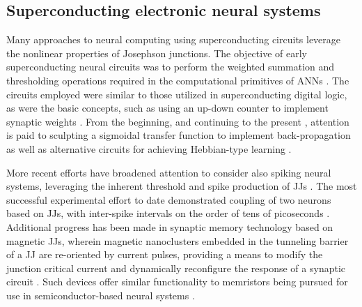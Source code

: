 \documentclass[twocolumn]{article}
\begin{document}
\subsection{Superconducting electronic neural systems}
Many approaches to neural computing using superconducting circuits leverage the nonlinear properties of Josephson junctions. The objective of early superconducting neural circuits was to perform the weighted summation and thresholding operations required in the computational primitives of ANNs \cite{hago1991,hiak1991}. The circuits employed were similar to those utilized in superconducting digital logic, as were the basic concepts, such as using an up-down counter to implement synaptic weights \cite{hiak1991}. From the beginning, and continuing to the present \cite{sckl2016,klsc2018,sosc2018}, attention is paid to sculpting a sigmoidal transfer function to implement back-propagation as well as alternative circuits for achieving Hebbian-type learning \cite{hago1991}.

More recent efforts have broadened attention to consider also spiking neural systems, leveraging the inherent threshold and spike production of JJs \cite{crsc2010,scdo2018}.  The most successful experimental effort to date demonstrated coupling of two neurons based on JJs, with inter-spike intervals on the order of tens of picoseconds \cite{sele2017}. Additional progress has been made in synaptic memory technology based on magnetic JJs, wherein magnetic nanoclusters embedded in the tunneling barrier of a JJ are re-oriented by current pulses, providing a means to modify the junction critical current and dynamically reconfigure the response of a synaptic circuit \cite{scdo2018}. Such devices offer similar functionality to memristors being pursued for use in semiconductor-based neural systems \cite{kiha2018}.
\end{document}
